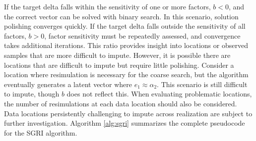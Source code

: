 If the target delta falls within the sensitivity of one or more factors, $b<0$, and the correct vector can be solved with binary search. In this scenario, solution polishing converges quickly. If the target delta falls outside the sensitivity of all factors, $b>0$, factor sensitivity must be repeatedly assessed, and convergence takes additional iterations. This ratio provides insight into locations or observed samples that are more difficult to impute. However, it is possible there are locations that are difficult to impute but require little polishing. Consider a location where resimulation is necessary for the coarse search, but the algorithm eventually generates a latent vector where $e_{1} \approx \alpha_{2}$. This scenario is still difficult to impute, though $b$ does not reflect this. When evaluating problematic locations, the number of resimulations at each data location should also be considered. Data locations persistently challenging to impute across realization are subject to further investigation. Algorithm \ref{alg:sgri} summarizes the complete pseudocode for the \gls{SGRI} algorithm.

